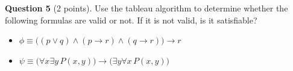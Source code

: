 \documentclass[12pt]{article}
\begin{document}
\vspace{0.2cm}

\noindent\textbf{Question 5} (2 points). Use the tableau algorithm to determine whether the following formulas are valid or not. If it is not valid, is it satisfiable?
\begin{itemize}
    \item[a)] $\phi \equiv \bigl( (p \vee q) \wedge (p \rightarrow r) \wedge (q \rightarrow r) \bigr) \rightarrow r$
    \item[b)] $\psi \equiv \bigl( \forall x \exists y\, P(x, y) \bigr) \rightarrow \bigl( \exists y \forall x\, P(x, y) \bigr)$
\end{itemize}
\end{document}
